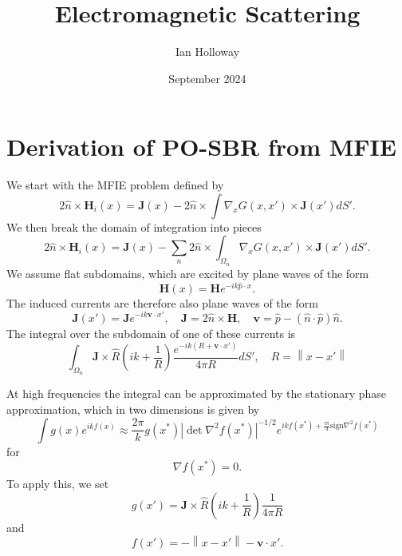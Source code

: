 \documentclass{article}
\title{Electromagnetic Scattering}
\author{Ian Holloway}
\date{September 2024}
\newcommand{\norm}[1]{\left\lVert #1 \right\rVert}
\newcommand{\abs}[1]{\left\lvert #1 \right\rvert}
\theoremstyle{plain}
\begin{document}
\maketitle


\section{Derivation of PO-SBR from MFIE}

We start with the MFIE problem defined by
\begin{equation}
	2\hat{n}\times\mathbf{H}_i(x)
	= \mathbf{J}(x)
	- 2\hat{n}\times\int \nabla_{x} G(x,x') \times \mathbf{J}(x')  dS'.
\end{equation}
We then break the domain of integration into pieces
\begin{equation}
	2\hat{n}\times\mathbf{H}_i(x)
	= \mathbf{J}(x)
	- \sum_n 2\hat{n}\times\int_{\Omega_n} \nabla_{x} G(x,x') \times \mathbf{J}(x') dS'.
\end{equation}
We assume flat subdomains, which are excited by plane waves of the form
\begin{equation}
	\mathbf{H}(x) = \mathbf{H}e^{-ik \hat{p} \cdot x}.
\end{equation}
The induced currents are therefore also plane waves of the form
\begin{equation}
	\mathbf{J}(x') = \mathbf{J}e^{-ik \mathbf{v} \cdot x'},
	\quad \mathbf{J} = 2\hat{n}\times\mathbf{H},
	\quad \mathbf{v} = \hat{p} - \left( \hat{n}\cdot\hat{p} \right)\hat{n}.
\end{equation}
The integral over the subdomain of one of these currents is
\begin{equation}
	\int_{\Omega_n}
	\mathbf{J} \times \hat{R}
	\left( ik + \frac{1}{R} \right)
	\frac{e^{-ik\left(R + \mathbf{v} \cdot x'\right)}}{4\pi R} dS',
	\quad R = \norm{x-x'}
\end{equation}



At high frequencies the integral can be approximated by the stationary phase approximation,
which in two dimensions is given by
\begin{equation}
	\int g(x) e^{ikf(x)}
	\approx \frac{2\pi}{k} g(x^*)
	\abs{\det \nabla^2 f(x^*)}^{-1/2}
	e^{ikf(x^*) + \frac{i\pi}{4}\text{sign}\nabla^2 f(x^*)}
\end{equation}
for
\begin{equation}
	\nabla f(x^*) = 0.
\end{equation}
To apply this, we set
\begin{equation}
	g(x') = 
	\mathbf{J} \times \hat{R}
	\left( ik + \frac{1}{R} \right)
	\frac{1}{4\pi R}
\end{equation}
and
\begin{equation}
	f(x') = -\norm{x-x'} - \mathbf{v}\cdot x'.
\end{equation}
\end{document}
